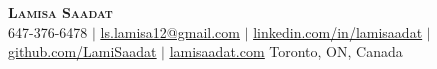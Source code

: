 \documentclass[letterpaper,11pt]{article}
\begin{document}

\begin{center}
    \textbf{\Huge \scshape Lamisa Saadat} \\ \vspace{1pt}
    \small 647-376-6478 $|$
    \href{mailto:ls.lamisa12@gmail.com}{\underline{ls.lamisa12@gmail.com}} $|$ 
    \href{http://www.linkedin.com/in/lamisaadat}{\underline{linkedin.com/in/lamisaadat}} $|$
    \href{https://github.com/LamiSaadat}{\underline{github.com/LamiSaadat}} $|$
    \href{http://www.lamisaadat.com}{\underline{lamisaadat.com}}
    \vspace{4pt} 
    \newline\small Toronto, ON, Canada 
\end{center}


\end{document}
